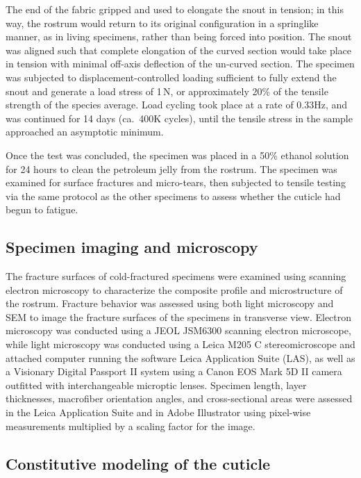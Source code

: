 \documentclass[twocolumn, linenumbers, superscriptaddress, nofootinbib]{revtex4-1}
\begin{document}
				The end of the fabric gripped and used to elongate the snout in tension; in this way, the rostrum would return to its original configuration in a springlike manner, as in living specimens, rather than being forced into position.
				The snout was aligned such that complete elongation of the curved section would take place in tension with minimal off-axis deflection of the un-curved section.
				The specimen was subjected to displacement-controlled loading sufficient to fully extend the snout and generate a load stress of 1\,N, or approximately 20\% of the tensile strength of the species average.
				Load cycling took place at a rate of 0.33Hz, and was continued for 14 days (ca.~400K cycles), until the tensile stress in the sample approached an asymptotic minimum.
				
				Once the test was concluded, the specimen was placed in a 50\% ethanol solution for 24 hours to clean the petroleum jelly from the rostrum.
				The specimen was examined for surface fractures and micro-tears, then subjected to tensile testing via the same protocol as the other specimens to assess whether the cuticle had begun to fatigue.
		
		\subsection*{Specimen imaging and microscopy}
			The fracture surfaces of cold-fractured specimens were examined using scanning electron microscopy to characterize the composite profile and microstructure of the rostrum.
			Fracture behavior was assessed using both light microscopy and SEM to image the fracture surfaces of the specimens in transverse view.
			Electron microscopy was conducted using a JEOL JSM6300 scanning electron microscope, while light microscopy was conducted using a Leica M205 C stereomicroscope and attached	computer running the software Leica Application Suite (LAS), as well as a Visionary Digital Passport II system using a Canon EOS Mark 5D II camera outfitted with interchangeable microptic lenses.
			Specimen length, layer thicknesses, macrofiber orientation angles, and cross-sectional areas were assessed in the Leica Application Suite and in Adobe Illustrator using pixel-wise measurements multiplied by a scaling factor for the image.
			
		\subsection*{Constitutive modeling of the cuticle}
\end{document}
